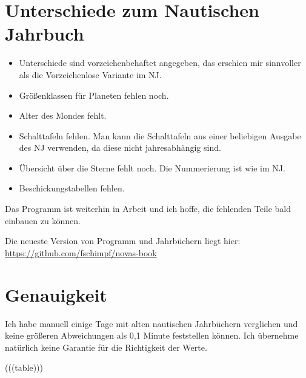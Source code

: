 \documentclass[a4paper, twoside]{book}
\begin{document}
\section{Unterschiede zum Nautischen Jahrbuch}
\begin{itemize}
\item Unterschiede sind vorzeichenbehaftet angegeben, das erschien mir sinnvoller als die Vorzeichenlose Variante im NJ.
\item Größenklassen für Planeten fehlen noch.
\item Alter des Mondes fehlt.
\item Schalttafeln fehlen. Man kann die Schalttafeln aus einer beliebigen Ausgabe des NJ verwenden, da diese nicht jahresabhängig sind.
\item Übersicht über die Sterne fehlt noch. Die Nummerierung ist wie im NJ.
\item Beschickungstabellen fehlen.
\end{itemize}

Das Programm ist weiterhin in Arbeit und ich hoffe, die fehlenden Teile bald einbauen zu können.

Die neueste Version von Programm und Jahrbüchern liegt hier: 
\href{url}{https://github.com/fschimpf/novas-book}

\section{Genauigkeit}
Ich habe manuell einige Tage mit alten nautischen Jahrbüchern verglichen und keine größeren Abweichungen als 0,1 Minute feststellen können. Ich übernehme natürlich keine Garantie für die Richtigkeit der Werte. 

\newpage

(((table)))
\end{document}
